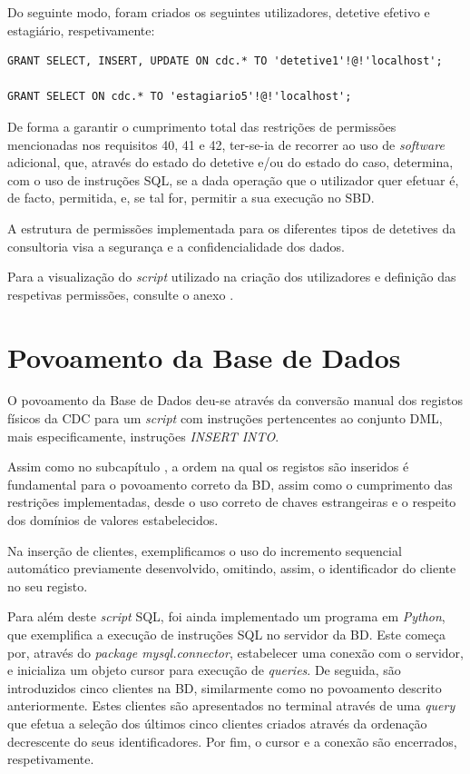 \documentclass[a4paper,12pt]{scrreprt}
\begin{document}
    Do seguinte modo, foram criados os seguintes utilizadores, detetive efetivo e estagiário, respetivamente:

    \vspace{0.4cm}
    \begin{lstlisting}[escapechar=!]
GRANT SELECT, INSERT, UPDATE ON cdc.* TO 'detetive1'!@!'localhost';

GRANT SELECT ON cdc.* TO 'estagiario5'!@!'localhost';
    \end{lstlisting}

    De forma a garantir o cumprimento total das restrições de permissões mencionadas nos requisitos 40, 41 e 42, ter-se-ia de recorrer ao uso de \textit{software} adicional, que, através do estado do detetive e/ou do estado do caso, determina, com o uso de instruções SQL, se a dada operação que o utilizador quer efetuar é, de facto, permitida, e, se tal for, permitir a sua execução no SBD.

    A estrutura de permissões implementada para os diferentes tipos de detetives da consultoria visa a segurança e a confidencialidade dos dados.

    Para a visualização do \textit{script} utilizado na criação dos utilizadores e definição das respetivas permissões, consulte o anexo \textit{}.

\clearpage
{}

\section{Povoamento da Base de Dados}

O povoamento da Base de Dados deu-se através da conversão manual dos registos físicos da CDC para um \textit{script} com instruções pertencentes ao conjunto DML, mais especificamente, instruções \textit{INSERT INTO}.

Assim como no subcapítulo \textit{}, a ordem na qual os registos são inseridos é fundamental para o povoamento correto da BD, assim como o cumprimento das restrições implementadas, desde o uso correto de chaves estrangeiras e o respeito dos domínios de valores estabelecidos.

Na inserção de clientes, exemplificamos o uso do incremento sequencial automático previamente desenvolvido, omitindo, assim, o identificador do cliente no seu registo.

Para além deste \textit{script} SQL, foi ainda implementado um programa em \textit{Python}, que exemplifica a execução de instruções SQL no servidor da BD. Este começa por, através do \textit{package mysql.connector}, estabelecer uma conexão com o servidor, e inicializa um objeto cursor para execução de \textit{queries}. De seguida, são introduzidos cinco clientes na BD, similarmente como no povoamento descrito anteriormente. Estes clientes são apresentados no terminal através de uma \textit{query} que efetua a seleção dos últimos cinco clientes criados através da ordenação decrescente do seus identificadores. Por fim, o cursor e a conexão são encerrados, respetivamente.
\end{document}
